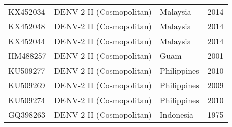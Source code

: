 \begin{longtable}{@{}llll@{}}
KX452034 & DENV-2 II (Cosmopolitan)   & Malaysia     & 2014            \\
KX452048 & DENV-2 II (Cosmopolitan)   & Malaysia     & 2014            \\
KX452044 & DENV-2 II (Cosmopolitan)   & Malaysia     & 2014            \\
HM488257 & DENV-2 II (Cosmopolitan)   & Guam         & 2001            \\
KU509277 & DENV-2 II (Cosmopolitan)   & Philippines  & 2010            \\
KU509269 & DENV-2 II (Cosmopolitan)   & Philippines  & 2009            \\
KU509274 & DENV-2 II (Cosmopolitan)   & Philippines  & 2010            \\
GQ398263 & DENV-2 II (Cosmopolitan)   & Indonesia    & 1975           
\end{longtable}